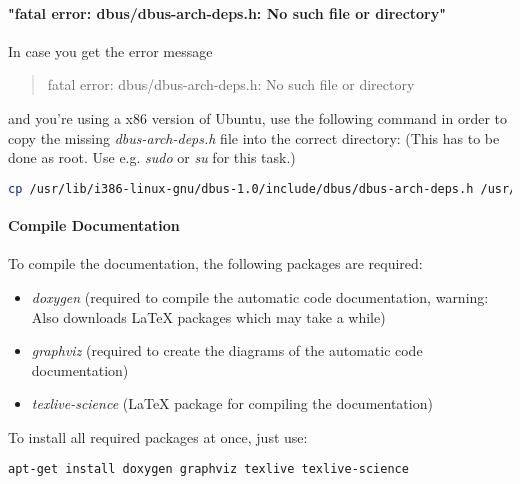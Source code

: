 \paragraph{"fatal error: dbus/dbus-arch-deps.h: No such file or directory"}
In case you get the error message \begin{quote}fatal error: dbus/dbus-arch-deps.h: No such file or directory\end{quote} and you're using a x86 version of Ubuntu, use the following command in order to copy the missing \emph{dbus-arch-deps.h} file into the correct directory: (This has to be done as root. Use e.g. \emph{sudo} or \emph{su} for this task.)
\begin{lstlisting}[language=sh]
cp /usr/lib/i386-linux-gnu/dbus-1.0/include/dbus/dbus-arch-deps.h /usr/include/dbus-1.0/dbus
\end{lstlisting}


\paragraph{Compile Documentation}
To compile the documentation, the following packages are required:
\begin{itemize}
\item{\emph{doxygen} (required to compile the automatic code documentation, warning: Also downloads \LaTeX{} packages which may take a while)}
\item{\emph{graphviz} (required to create the diagrams of the automatic code documentation)}
\item{\emph{texlive-science} (\LaTeX{} package for compiling the documentation)}
\end{itemize}

To install all required packages at once, just use:
\begin{lstlisting}[language=sh]
apt-get install doxygen graphviz texlive texlive-science
\end{lstlisting}


